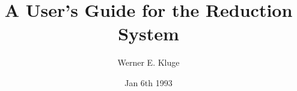 \load{\normalsize}{\sc}

\makeindex


\title{A User's Guide for the Reduction System \pired}
\author{Werner E. Kluge}
\date{Jan 6th 1993}
\maketitle
\newpage
{}
\tableofcontents
\setcounter{page}{0}
\newpage
\newpage

\setcounter{section}{1}











\clearpage
{}
\printindex


